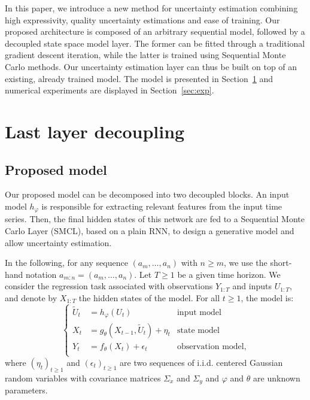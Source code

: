 \documentclass{article}
\begin{document}
In this paper, we introduce a new method for uncertainty estimation combining high expressivity, quality uncertainty estimations and ease of training.
Our proposed architecture is composed of an arbitrary sequential model, followed by a decoupled state space model layer.
The former can be fitted through a traditional gradient descent iteration, while the latter is trained using Sequential Monte Carlo methods.
Our uncertainty estimation layer can thus be built on top of an existing, already trained model. The model is presented in Section~\ref{sec:decoupling} and numerical experiments are displayed in Section~\ref{sec:exp}.

\section{Last layer decoupling}
\label{sec:decoupling}

\subsection{Proposed model}%
\label{sub:proposed_architecture}

Our proposed model can be decomposed into two decoupled blocks.
An input model $h_\varphi$ is responsible for extracting relevant features from the input time series. Then, the final hidden states of this network are fed to a Sequential Monte Carlo Layer (SMCL), based on a plain RNN, to design a generative model and allow uncertainty estimation.

In the following, for any sequence $(a_m,\ldots, a_n)$ with $n\geq m$, we use the short-hand notation $a_{m:n} = (a_m,\ldots, a_n)$. Let $T\ge 1$ be a given time horizon. We consider the regression task associated with observations $Y_{1:T}$ and inputs $U_{1:T}$, and denote by $X_{1:T}$ the hidden states of the model. For all $t\geq 1$, the model is:
\begin{equation*}
	\left\{
	\begin{aligned}
		\widetilde U_t & = h_\varphi(U_t)                        & \text{input model}       \\
		X_t        & = g_\theta(X_{t-1}, \widetilde U_t) + \eta_t& \text{state model}       \\
		Y_t        & = f_\theta(X_t)       + \epsilon_t      & \text{observation model,} \\
	\end{aligned}
	\right.
\end{equation*}
where $(\eta_t)_{t\geq 1}$ and $(\epsilon_t)_{t\geq 1}$ are two sequences of i.i.d. centered Gaussian random variables with covariance matrices $\Sigma_x$ and $\Sigma_y$ and $\varphi$ and $\theta$ are unknown parameters.
\end{document}
